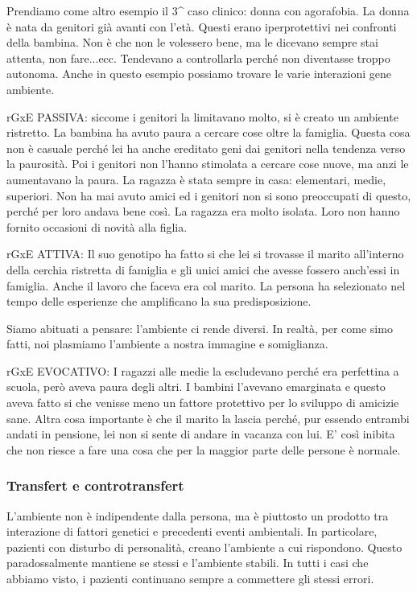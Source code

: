 Prendiamo come altro esempio il 3\^{} caso clinico: donna con
agorafobia. La donna è nata da genitori già avanti con l'età. Questi
erano iperprotettivi nei confronti della bambina. Non è che non le
volessero bene, ma le dicevano sempre stai attenta, non fare...ecc.
Tendevano a controllarla perché non diventasse troppo autonoma. Anche in
questo esempio possiamo trovare le varie interazioni gene ambiente.

rGxE PASSIVA: siccome i genitori la limitavano molto, si è creato un
ambiente ristretto. La bambina ha avuto paura a cercare cose oltre la
famiglia. Questa cosa non è casuale perché lei ha anche ereditato geni
dai genitori nella tendenza verso la paurosità. Poi i genitori non
l'hanno stimolata a cercare cose nuove, ma anzi le aumentavano la paura.
La ragazza è stata sempre in casa: elementari, medie, superiori. Non ha
mai avuto amici ed i genitori non si sono preoccupati di questo, perché
per loro andava bene così. La ragazza era molto isolata. Loro non hanno
fornito occasioni di novità alla figlia.

rGxE ATTIVA: Il suo genotipo ha fatto si che lei si trovasse il marito
all'interno della cerchia ristretta di famiglia e gli unici amici che
avesse fossero anch'essi in famiglia. Anche il lavoro che faceva era col
marito. La persona ha selezionato nel tempo delle esperienze che
amplificano la sua predisposizione.

Siamo abituati a pensare: l'ambiente ci rende diversi. In realtà, per
come simo fatti, noi plasmiamo l'ambiente a nostra immagine e
somiglianza.

rGxE EVOCATIVO: I ragazzi alle medie la escludevano perché era
perfettina a scuola, però aveva paura degli altri. I bambini l'avevano
emarginata e questo aveva fatto si che venisse meno un fattore
protettivo per lo sviluppo di amicizie sane. Altra cosa importante è che
il marito la lascia perché, pur essendo entrambi andati in pensione, lei
non si sente di andare in vacanza con lui. E' così inibita che non
riesce a fare una cosa che per la maggior parte delle persone è normale.

\subsubsection{Transfert e controtransfert}

L'ambiente non è indipendente dalla persona, ma è piuttosto un prodotto
tra interazione di fattori genetici e precedenti eventi ambientali. In
particolare, pazienti con disturbo di personalità, creano l'ambiente a
cui rispondono. Questo paradossalmente mantiene se stessi e l'ambiente
stabili. In tutti i casi che abbiamo visto, i pazienti continuano sempre
a commettere gli stessi errori.


